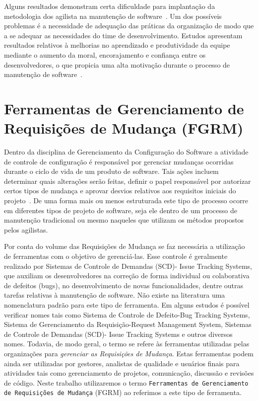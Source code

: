 Alguns resultados demonstram certa dificuldade para implantação da metodologia
dos agilista na manutenção de software~\cite{1402140}. Um dos possíveis
problemas é a necessidade de adequação das práticas da organização de modo que a
se adequar as necessidades do time de desenvolvimento.  Estudos apresentam
resultados relativos à melhorias no aprendizado e produtividade da equipe
mediante o aumento da moral, encorajamento e confiança entre os desenvolvedores,
o que propicia uma alta motivação durante o processo de manutenção de
software~\cite{Choudhari:2014:EIM:2557833.2557845}.

\section{Ferramentas de Gerenciamento de Requisições de Mudança (FGRM)}
\label{sec:ferramentas_de_gerenciameto_de_requisições_de_mudança}

Dentro da disciplina de Gerenciamento da Configuração do Software a atividade de
controle de configuração é responsável por gerenciar mudanças ocorridas durante
o ciclo de vida de um produto de software. Tais ações incluem determinar quais
alterações serão feitas, definir o papel responsável por autorizar certos tipos
de mudança e aprovar desvios relativos aos requisitos iniciais do
projeto~\cite{4425813}. De uma forma mais ou menos estruturada este tipo de
processo ocorre em diferentes tipos de projeto de software, seja ele dentro de
um processo de manutenção tradicional ou mesmo naqueles que utilizam os métodos
propostos pelos agilistas.

Por conta do volume das Requisições de Mudança se faz necessária a utilização de
ferramentas com o objetivo de gerenciá-las. Esse controle é geralmente realizado
por Sistemas de Controle de Demandas (SCD)- Issue Tracking Systems, que auxiliam
os desenvolvedores na correção de forma individual ou colaborativa de defeitos
(bugs), no desenvolvimento de novas funcionalidades, dentre outras tarefas
relativas à manutenção de software. Não existe na literatura uma nomenclatura
padrão para este tipo de ferramenta. Em alguns estudos é possível verificar
nomes tais como Sistema de Controle de Defeito\@-\@ Bug Tracking Systems,
Sistema de Gerenciamento da Requisição\@-\@ Request Management System, Sistemas
de Controle de Demandas (SCD)- Issue Tracking Systems e outros diversos nomes.
Todavia, de modo geral, o termo se refere às ferramentas utilizadas pelas
organizações para \textit{gerenciar as Requisições de Mudança}. Estas ferramentas
podem ainda ser utilizadas por gestores, analistas de qualidade e usuários
finais para atividades tais como gerenciamento de projetos, comunicação,
discussão e revisões de código. Neste trabalho utilizaremos o termo
\texttt{Ferramentas de Gerenciamento de Requisições de Mudança} (FGRM) ao
referimos a este tipo de ferramenta.

